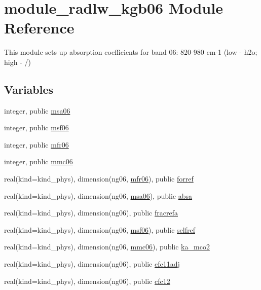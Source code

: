\hypertarget{namespacemodule__radlw__kgb06}{}\section{module\+\_\+radlw\+\_\+kgb06 Module Reference}
\label{namespacemodule__radlw__kgb06}


This module sets up absorption coefficients for band 06\+: 820-\/980 cm-\/1 (low -\/ h2o; high -\/ /)  


\subsection*{Variables}
\begin{DoxyCompactItemize}
\item 
integer, public \hyperlink{namespacemodule__radlw__kgb06_add7b5d0d3ea44e1e677948c33e870333}{msa06}
\item 
integer, public \hyperlink{namespacemodule__radlw__kgb06_a65f808aeb87457d383dd7f9366878fb9}{msf06}
\item 
integer, public \hyperlink{namespacemodule__radlw__kgb06_aaf1f13cdb5c2888b416a91e8b17e41d8}{mfr06}
\item 
integer, public \hyperlink{namespacemodule__radlw__kgb06_af7a377cb66fd48348789c20f5a31dec6}{mmc06}
\item 
real(kind=kind\+\_\+phys), dimension(ng06, \hyperlink{namespacemodule__radlw__kgb06_aaf1f13cdb5c2888b416a91e8b17e41d8}{mfr06}), public \hyperlink{namespacemodule__radlw__kgb06_a6a0467b666bc75f90ae58fa4f58f07f0}{forref}
\item 
real(kind=kind\+\_\+phys), dimension(ng06, \hyperlink{namespacemodule__radlw__kgb06_add7b5d0d3ea44e1e677948c33e870333}{msa06}), public \hyperlink{namespacemodule__radlw__kgb06_a21bd40309855c89a64b88be171bfde59}{absa}
\item 
real(kind=kind\+\_\+phys), dimension(ng06), public \hyperlink{namespacemodule__radlw__kgb06_a1354ecbc5f07cd763847333e680c686a}{fracrefa}
\item 
real(kind=kind\+\_\+phys), dimension(ng06, \hyperlink{namespacemodule__radlw__kgb06_a65f808aeb87457d383dd7f9366878fb9}{msf06}), public \hyperlink{namespacemodule__radlw__kgb06_a98901725947a4477924a47af5e67277e}{selfref}
\item 
real(kind=kind\+\_\+phys), dimension(ng06, \hyperlink{namespacemodule__radlw__kgb06_af7a377cb66fd48348789c20f5a31dec6}{mmc06}), public \hyperlink{namespacemodule__radlw__kgb06_adb5dab732383b82e89f1048ab5150c23}{ka\+\_\+mco2}
\item 
real(kind=kind\+\_\+phys), dimension(ng06), public \hyperlink{namespacemodule__radlw__kgb06_a8b0813723ba69b1afbe2552f6b730267}{cfc11adj}
\item 
real(kind=kind\+\_\+phys), dimension(ng06), public \hyperlink{namespacemodule__radlw__kgb06_a44f5934520edc537b5df004774b0ef71}{cfc12}
\end{DoxyCompactItemize}



